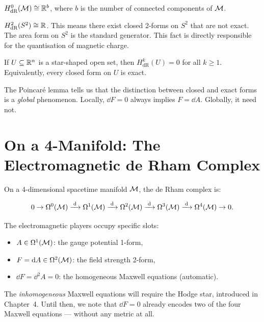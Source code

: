 \begin{example}
$H^0_{\text{dR}}(\mathcal{M}) \cong \mathbb{R}^b$, where $b$ is the number of connected components of $\mathcal{M}$.
\end{example}

\begin{example}
$H^2_{\text{dR}}(S^2) \cong \mathbb{R}$. This means there exist closed 2-forms on $S^2$ that are not exact. The area form on $S^2$ is the standard generator. This fact is directly responsible for the quantisation of magnetic charge.
\end{example}

\begin{theorem}
If $U \subseteq \mathbb{R}^n$ is a star-shaped open set, then $H^k_{\text{dR}}(U) = 0$ for all $k \geq 1$. Equivalently, every closed form on $U$ is exact.
\end{theorem}

The Poincar\'e lemma tells us that the distinction between closed and exact forms is a \emph{global} phenomenon. Locally, $\dd F = 0$ always implies $F = \dd A$. Globally, it need not.

\section{On a 4-Manifold: The Electromagnetic de Rham Complex}

On a 4-dimensional spacetime manifold $\mathcal{M}$, the de Rham complex is:

\begin{equation}
0 \to \Omega^0(\mathcal{M}) \xrightarrow{\;\mathrm{d}\;} \Omega^1(\mathcal{M}) \xrightarrow{\;\mathrm{d}\;} \Omega^2(\mathcal{M}) \xrightarrow{\;\mathrm{d}\;} \Omega^3(\mathcal{M}) \xrightarrow{\;\mathrm{d}\;} \Omega^4(\mathcal{M}) \to 0.
\end{equation}

The electromagnetic players occupy specific slots:
\begin{itemize}
\item $A \in \Omega^1(\mathcal{M})$: the gauge potential 1-form,
\item $F = \mathrm{d} A \in \Omega^2(\mathcal{M})$: the field strength 2-form,
\item $\dd F = \dd^2 A = 0$: the homogeneous Maxwell equations (automatic).
\end{itemize}

The \emph{inhomogeneous} Maxwell equations will require the Hodge star, introduced in Chapter~4. Until then, we note that $\dd F = 0$ already encodes two of the four Maxwell equations --- without any metric at all.

